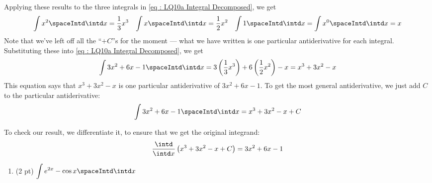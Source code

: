 {Applying these results to the three integrals in \eqref{eq : LQ10a Integral Decomposed}, we get
\begin{align*}
\int x^{2} \spaceIntd \intd x
=
\frac{1}{3} x^{3}
&&
\int x \spaceIntd \intd x
=
\frac{1}{2} x^{2}
&&
\int 1 \spaceIntd \intd x
=
\int x^{0} \spaceIntd \intd x
=
x
\end{align*}
Note that we've left off all the ``$+ C$''s for the moment --- what we have written is one particular antiderivative for each integral. Substituting these into \eqref{eq : LQ10a Integral Decomposed}, we get
\begin{align*}
\int 3 x^{2} + 6 x - 1 \spaceIntd \intd x
=
3 \left(\frac{1}{3} x^{3}\right) + 6 \left(\frac{1}{2} x^{2}\right) - x
=
x^{3} + 3 x^{2} - x
\end{align*}
This equation says that $x^{3} + 3 x^{2} - x$ is one particular antiderivative of $3 x^{2} + 6 x - 1$. To get the most general antiderivative, we just add $C$ to the particular antiderivative:
\begin{align*}
\int 3 x^{2} + 6 x - 1 \spaceIntd \intd x
=
x^{3} + 3 x^{2} - x + C
\end{align*}

To check our result, we differentiate it, to ensure that we get the original integrand:
\begin{align*}
\frac{\intd}{\intd x} \left(x^{3} + 3 x^{2} - x + C\right)
=
3 x^{2} + 6 x - 1
\end{align*}}%



\begin{enumerate}[resume,label=(\alph*)]
\item\label{itm : LQ10b} (2 pt) $\displaystyle\int e^{2 x} - \cos x \spaceIntd \intd x$
\end{enumerate}

